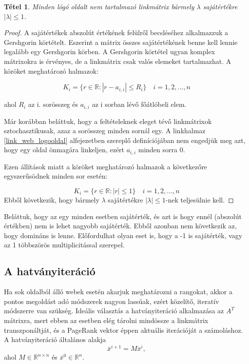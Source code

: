 \documentclass[12pt,a4paper]{article}
\newtheorem{tetel}{Tétel}
\begin{document}
\begin{tetel}
	Minden lógó oldalt nem tartalmazó linkmátrix bármely $\lambda$ sajátértékre $ |\lambda| \leq 1$.
\end{tetel}
\begin{proof}
	A sajátértékek abszolút értékének felülről becsléséhez alkalmazzuk a Gershgorin körtételt. Eszerint a mátrix összes sajátértékének benne kell lennie legalább egy Gershgorin körben. A Gershgorin körtétel ugyan komplex mátrixokra is érvényes, de a linkmátrix csak valós elemeket tartalmazhat. A köröket meghatározó halmazok: 
	
	\[ K_i = \{ r \in \mathbb{R}: |r - a_{i,i}| \leq R_i \} \quad i = 1,2,...,n \]
	
	ahol $R_i$ az i. sorösszeg és $a_{i,i}$ az i sorban lévő főátlóbeli elem.
	
	Már korábban beláttuk, hogy a feltételeknek eleget tévő linkmátrixok sztochasztikusak, azaz a sorösszeg minden sornál egy. A linkhalmaz \ref{link_web_logooldal} alfejezetben szereplő definíciójában nem engedjük meg azt, hogy egy oldal önmagára linkeljen, ezért $a_{i,i}$ minden sorra 0.
	
	Ezen állítások miatt a köröket meghatározó halmazok a következőre egyszerűsödnek minden sor esetén:
	
	\[ K_i = \{ r \in \mathbb{R}: |r| \leq 1 \} \quad i = 1,2,...,n \]
	Ebből következik, hogy bármely $\lambda$ sajátértékre $ |\lambda| \leq 1$-nek teljesülnie kell.
\end{proof}

Beláttuk, hogy az egy minden esetben sajátérték, és azt is hogy ennél (abszolút értékben) nem is lehet nagyobb sajátérték. Ebből azonban nem következik az, hogy domináns is lenne. Előfordulhat olyan eset is, hogy a -1 is sajátérték, vagy az 1 többszörös multiplicitással szerepel.

\subsection{A hatványiteráció}

Ha sok oldalból álló webek esetén akarjuk meghatározni a rangokat, akkor a pontos megoldást adó módszerek nagyon lassúak, ezért közelítő, iteratív módszerre van szükség. Ideális választás a hatványiteráció alkalmazása az $A^T$ mátrixra, mert ebben az esetben elég tárolni mindössze a linkmátrix transzponáltját, és a PageRank vektor éppen aktuális iterációját a számoláshoz. A hatványiteráció általános alakja
\[ \bar{x}^{i+1} = M \bar{x}^i, \]
ahol $M \in \mathbb{R}^{n \times n}$ és $\bar{x}^0 \in \mathbb{R}^n$.
\vspace{0.2cm}
\end{document}
